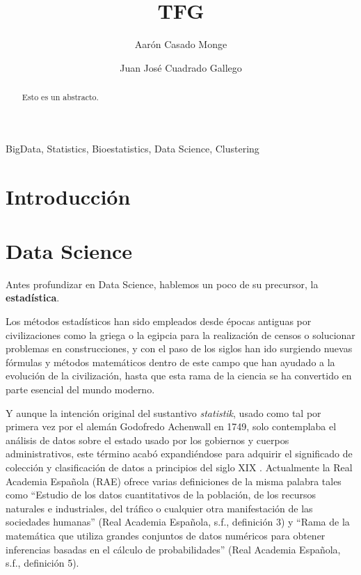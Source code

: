 \documentclass[3p,twocolumn]{elsarticle}
\begin{document}
\title{TFG} %
\author[1]{Aarón Casado Monge} %

\author[2]{Juan José Cuadrado Gallego} %

\address{University of Alcala, Polytechnic School, Computer Science Department, Scientific and Technological Campus, Politechnic Building. Office: O243, 28805, Alcala de Henares, Madrid, Spain}

\begin{abstract}
Esto es un abstracto.
\end{abstract}

\begin{keyword}
BigData, Statistics, Bioestatistics, Data Science, Clustering
\end{keyword}

\maketitle %
 
\section{Introducción}

\section{Data Science} 

Antes profundizar en Data Science, hablemos un poco de su precursor, la \textbf{estadística}.

Los métodos estadísticos han sido empleados desde épocas antiguas por civilizaciones como la griega o la egipcia para la realización de censos o solucionar problemas en construcciones, y con el paso de los siglos han ido surgiendo nuevas fórmulas y métodos matemáticos dentro de este campo que han ayudado a la evolución de la civilización, hasta que esta rama de la ciencia se ha convertido en parte esencial del mundo moderno.

Y aunque la intención original del sustantivo \textit{statistik}, usado como tal por primera vez por el alemán Godofredo Achenwall en 1749, solo contemplaba el análisis de datos sobre el estado usado por los gobiernos y cuerpos administrativos, este término acabó expandiéndose para adquirir el significado de colección y clasificación de datos a principios del siglo XIX \cite{cita1} \cite{cita2}. Actualmente la Real Academia Española (RAE) ofrece varias definiciones de la misma palabra tales como ``Estudio de los datos cuantitativos de la población, de los recursos naturales e industriales, del tráfico o cualquier otra manifestación de las sociedades humanas'' (Real Academia Española, s.f., definición 3) y ``Rama de la matemática que utiliza grandes conjuntos de datos numéricos para obtener inferencias basadas en el cálculo de probabilidades'' (Real Academia Española, s.f., definición 5).
\end{document}
